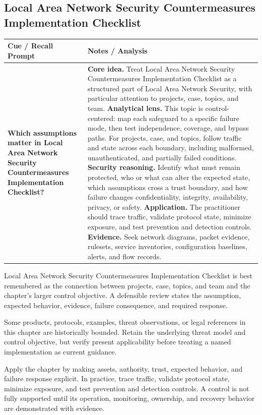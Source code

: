 \documentclass[11pt]{article}
\newcommand{\CornellHeader}{%
\rowcolor{Navy}\color{white}\bfseries Cue / Recall Prompt & \color{white}\bfseries Notes / Analysis\\\hline}
\newcommand{\CornellRow}[2]{%
\cellcolor{CueGray}\RaggedRight\textbf{#1} & \RaggedRight #2\\\hline}
\begin{document}
\subsection*{Local Area Network Security Countermeasures Implementation Checklist}
\begin{longtable}{>{\RaggedRight\arraybackslash}p{}|>{\RaggedRight\arraybackslash}p{}}
\CornellHeader
\CornellRow{Which assumptions matter in Local Area Network Security Countermeasures Implementation Checklist?}{\textbf{Core idea.} Treat Local Area Network Security Countermeasures Implementation Checklist as a structured part of Local Area Network Security, with particular attention to projects, case, topics, and team. \textbf{Analytical lens.} This topic is control-centered: map each safeguard to a specific failure mode, then test independence, coverage, and bypass paths. For projects, case, and topics, follow traffic and state across each boundary, including malformed, unauthenticated, and partially failed conditions. \textbf{Security reasoning.} Identify what must remain protected, who or what can alter the expected state, which assumptions cross a trust boundary, and how failure changes confidentiality, integrity, availability, privacy, or safety. \textbf{Application.} The practitioner should trace traffic, validate protocol state, minimize exposure, and test prevention and detection controls. \textbf{Evidence.} Seek network diagrams, packet evidence, rulesets, service inventories, configuration baselines, alerts, and flow records.}
\end{longtable}
\begin{topicsummary}
Local Area Network Security Countermeasures Implementation Checklist is best remembered as the connection between projects, case, topics, and team and the chapter's larger control objective. A defensible review states the assumption, expected behavior, evidence, failure consequence, and required response.
\end{topicsummary}
\begin{historybox}
Some products, protocols, examples, threat observations, or legal references in this chapter are historically bounded. Retain the underlying threat model and control objective, but verify present applicability before treating a named implementation as current guidance.
\end{historybox}
\begin{defensebox}
Apply the chapter by making assets, authority, trust, expected behavior, and failure response explicit. In practice, trace traffic, validate protocol state, minimize exposure, and test prevention and detection controls. A control is not fully supported until its operation, monitoring, ownership, and recovery behavior are demonstrated with evidence.
\end{defensebox}
\end{document}

